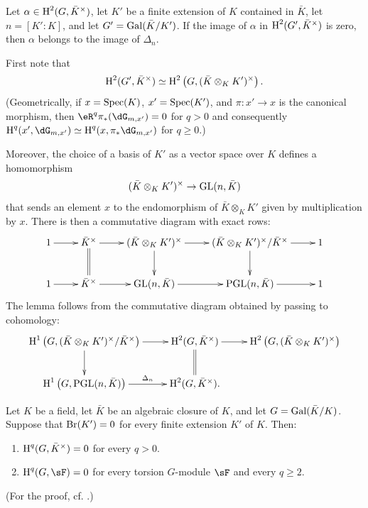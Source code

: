 \begin{lemma}\label{I:3-1-5}
Let $\alpha\in\operatorname{H}^2(G,\bar K^\times)$, let $K'$ be a finite extension of
$K$ contained in $\bar K$, let $n=[K':K]$, and let
$G'=\operatorname{Gal}(\bar K/K')$. If the image of $\alpha$ in
$\operatorname{H}^2(G',\bar K^\times)$ is zero, then $\alpha$ belongs to the image of
$\Delta_n$.
\end{lemma}

First note that
\[
  \operatorname{H}^2(G',\bar K^\times) \simeq \operatorname{H}^2\left(G,(\bar K\otimes_K K')^\times\right)\text{.}
\]
(Geometrically, if $x=\operatorname{Spec}(K)$, $x'=\operatorname{Spec}(K')$, and
$\pi:x'\to x$ is the canonical morphism, then
$\eR^q\pi_*(\dG_{m,x'})=0$ for $q>0$ and consequently
$\h^q(x',\dG_{m,x'})\simeq\h^q(x,\pi_*\dG_{m,x'})$ for
$q\geqslant0$.)

Moreover, the choice of a basis of $K'$ as a vector space over $K$
defines a homomorphism
\[
  (\bar K\otimes_K K')^\times \to \operatorname{GL}(n,\bar K)
\]
that sends an element $x$ to the endomorphism of $\bar K\otimes_KK'$
given by multiplication by $x$. There is then a commutative diagram with
exact rows:
\[\xymatrix{
  1 \ar[r]
    & \bar K^\times \ar[r] \ar@{=}[d]
    & (\bar K\otimes_K K')^\times \ar[r] \ar[d]
    & (\bar K\otimes_K K')^\times / \bar K^\times \ar[r] \ar[d]
    & 1 \\
  1 \ar[r]
    & \bar K^\times \ar[r]
    & \gl(n,\bar K) \ar[r]
    & \pgl(n,\bar K) \ar[r]
    & 1
}\]
The lemma follows from the commutative diagram obtained by passing to
cohomology:
\[\xymatrix{
  \h^1\left(G,(\bar K\otimes_K K')^\times/\bar K^\times\right) \ar[r] \ar[d]
    & \h^2(G,\bar K^\times) \ar[r] \ar@{=}[d]
    & \h^2\left(G,(\bar K\otimes_K K')^\times\right) \\
  \h^1\left(G,\pgl(n,\bar K)\right) \ar[r]^-{\Delta_n}
    & \h^2(G,\bar K^\times) \text{.}
}\]

\begin{proposition}\label{I:3-1-6}
Let $K$ be a field, let $\bar K$ be an algebraic closure of $K$, and let
$G=\operatorname{Gal}(\bar K/K)$. Suppose that $\operatorname{Br}(K')=0$ for every finite extension
$K'$ of $K$. Then:
\begin{enumerate}[\indent i)]
  \item $\operatorname{H}^q(G,\bar K^\times)=0$ for every $q>0$.
  \item $\h^q(G,\sF)=0$ for every torsion $G$-module $\sF$ and every
    $q\geqslant2$.
\end{enumerate}
\end{proposition}

(For the proof, cf. \cite{se94}.)

